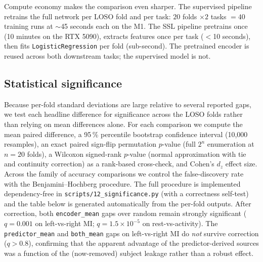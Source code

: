 Compute economy makes the comparison even sharper. The supervised
pipeline retrains the full network per LOSO fold and per task: $20$
folds $\times 2$ tasks $= 40$ training runs at $\sim$45 seconds each on
the M1. The SSL pipeline pretrains once (10 minutes on the RTX 5090),
extracts features once per task ($<$10 seconds), then fits
\texttt{LogisticRegression} per fold (sub-second). The pretrained
encoder is reused across both downstream tasks; the supervised model is
not.

\subsection{Statistical significance}
\label{sec:results:significance}

Because per-fold standard deviations are large relative to several reported
gaps, we test each headline difference for significance across the LOSO
folds rather than relying on mean differences alone. For each comparison we
compute the mean paired difference, a 95\,\% percentile bootstrap confidence
interval (10{,}000 resamples), an exact paired sign-flip permutation
$p$-value (full $2^{n}$ enumeration at $n{=}20$ folds), a Wilcoxon
signed-rank $p$-value (normal approximation with tie and continuity
correction) as a rank-based cross-check, and Cohen's $d_z$ effect size.
Across the family of accuracy comparisons we control the false-discovery
rate with the Benjamini--Hochberg procedure. The full procedure is
implemented dependency-free in \texttt{scripts/12\_significance.py} (with a
correctness self-test) and the table below is generated automatically from
the per-fold outputs.
After correction, both \texttt{encoder\_mean} gaps over random remain
strongly significant ($q{=}0.001$ on left-vs-right MI; $q{=}1.5\times
10^{-5}$ on rest-vs-activity). The \texttt{predictor\_mean} and
\texttt{both\_mean} gaps on left-vs-right MI do \emph{not} survive
correction ($q{>}0.8$), confirming that the apparent advantage of the
predictor-derived sources was a function of the (now-removed) subject
leakage rather than a robust effect.

  {}
  {
    {}
    {}}

